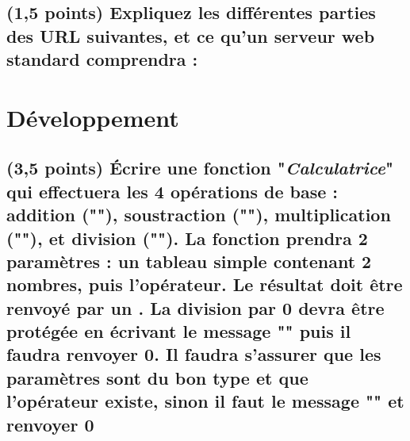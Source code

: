 \documentclass[11pt,a4paper]{article}
\begin{document}
\renewcommand\arraystretch{1}

\bigskip

\subsection{(1,5 points) Expliquez les différentes parties des URL suivantes, et ce qu'un serveur web standard comprendra :}

\bigskip


\bigskip
\bigskip
\bigskip
\bigskip
\bigskip
\bigskip
\bigskip
\bigskip
\bigskip
\bigskip
\bigskip
\bigskip


\bigskip
\bigskip
\bigskip
\bigskip
\bigskip
\bigskip
\bigskip
\bigskip
\bigskip
\bigskip
\bigskip
\bigskip


\bigskip
\bigskip
\bigskip
\bigskip
\bigskip
\bigskip
\bigskip
\bigskip
\bigskip
\bigskip
\bigskip
\bigskip

\bigskip

\newpage

\section{Développement}

\subsection{(3,5 points) \'Ecrire une fonction "\textit{Calculatrice}" qui effectuera les 4 opérations de base : addition ("\TTBF{+}"), soustraction ("\TTBF{-}"), multiplication ("\TTBF{*}"), et division ("\TTBF{/}"). La fonction prendra 2 paramètres : un tableau simple contenant 2 nombres, puis l'opérateur. Le résultat doit être renvoyé par un . La division par 0 devra être protégée en écrivant le message "" puis il faudra renvoyer 0. Il faudra s'assurer que les paramètres sont du bon type et que l'opérateur existe, sinon il faut le message "" et renvoyer 0}



\end{document}

